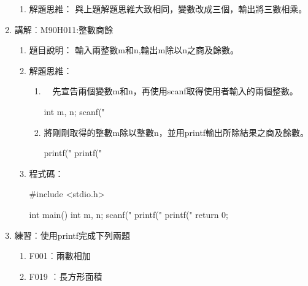 \begin{enumerate}
\begin{enumerate}
			\item 解題思維：
			\subitem 與上題解題思維大致相同，變數改成三個，輸出將三數相乘。
\begin{comment}			
			\item 程式碼：
			\begin{cppcode}
				#include <iostream>
				
				using namespace std;
				
				int main()
				{
					int a, b, c;
					cin >> a >> b >> c;
					cout << a*b*c;
					return 0;	
				}
			\end{cppcode}
\end{comment}
		\end{enumerate}
		
	\item 講解︰M90H011:整數商餘%
		\begin{enumerate}
			\item 題目說明：
			\subitem 
			輸入兩整數m和n,輸出m除以n之商及餘數。
			\item 解題思維：
			\begin{enumerate}
			\item 　先宣告兩個變數m和n，再使用scanf取得使用者輸入的兩個整數。
			\begin{inside}
			int m, n;
			scanf("%
			\end{inside}
			\item  將剛剛取得的整數m除以整數n，並用printf輸出所除結果之商及餘數。
			\begin{inside}
			printf("\n%
			printf("\n%
			\end{inside}
			\end{enumerate}
			
			\item 程式碼：
			\begin{cppcode}
				#include <stdio.h>
				
				int main()
				{
					int m, n;
					scanf("%
					printf("\n%
					printf("\n%
					return 0;
				}
			\end{cppcode}
		\end{enumerate}
	
	\item 練習︰使用printf完成下列兩題
	\begin{enumerate}
		\item F001︰兩數相加
		\item F019 ︰長方形面積
	\end{enumerate}
\end{enumerate}


